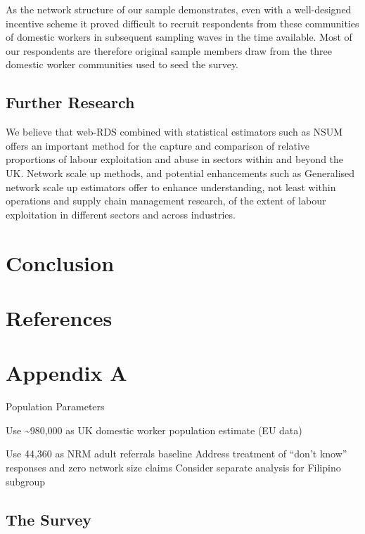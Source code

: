 \documentclass[
  12pt,
  letterpaper,
  DIV=11,
  numbers=noendperiod]{scrartcl}
\theoremstyle{plain}
\theoremstyle{definition}
\begin{document}
As the network structure of our sample demonstrates, even with a
well-designed incentive scheme it proved difficult to recruit
respondents from these communities of domestic workers in subsequent
sampling waves in the time available. Most of our respondents are
therefore original sample members draw from the three domestic worker
communities used to seed the survey.

\subsection{Further Research}\label{further-research}

We believe that web-RDS combined with statistical estimators such as
NSUM offers an important method for the capture and comparison of
relative proportions of labour exploitation and abuse in sectors within
and beyond the UK. Network scale up methods, and potential enhancements
such as Generalised network scale up estimators offer to enhance
understanding, not least within operations and supply chain management
research, of the extent of labour exploitation in different sectors and
across industries.

\section{Conclusion}\label{conclusion}

\newpage

\newpage

\section{References}\label{references}

\printbibliography[heading=none]

\newpage

\appendix

\section{Appendix A}\label{app-a}

Population Parameters

Use \textasciitilde980,000 as UK domestic worker population estimate (EU
data)

Use 44,360 as NRM adult referrals baseline Address treatment of ``don't
know'' responses and zero network size claims Consider separate analysis
for Filipino subgroup

\subsection{The Survey}\label{the-survey}
\end{document}
